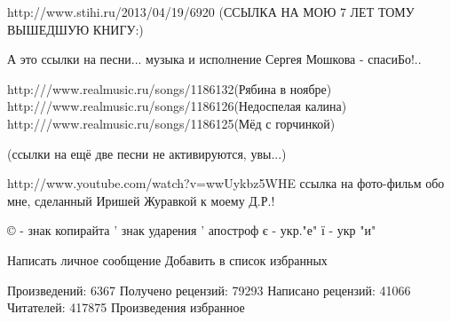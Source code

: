 http://www.stihi.ru/2013/04/19/6920
(ССЫЛКА НА МОЮ 7 ЛЕТ ТОМУ ВЫШЕДШУЮ КНИГУ:)

А это ссылки на песни... музыка и исполнение Сергея Мошкова - спасиБо!..

http:///www.realmusic.ru/songs/1186132(Рябина в ноябре)
http:///www.realmusic.ru/songs/1186126(Недоспелая калина)
http:///www.realmusic.ru/songs/1186125(Мёд с горчинкой)

(ссылки на ещё две песни не активируются, увы...)

http://www.youtube.com/watch?v=wwUykbz5WHE
ссылка на фото-фильм обо мне, сделанный Иришей Журавкой к моему Д.Р.!

© - знак копирайта
' знак ударения
’ апостроф
є - укр."е"
ї - укр "и"

Написать личное сообщение    Добавить в список избранных

Произведений: 6367
Получено рецензий: 79293
Написано рецензий: 41066
Читателей: 417875
Произведения
избранное

